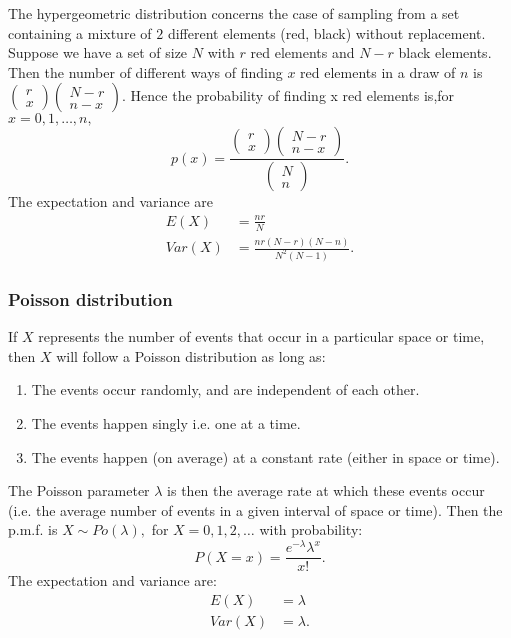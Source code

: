 \documentclass[12pt, a4paper]{article}
\theoremstyle{definition}
\theoremstyle{plain}
\begin{document}
The hypergeometric distribution concerns the case of sampling from a set containing a mixture of
$2$ different elements (red, black) without replacement. Suppose we have a set of size $N$ with $r$ red elements and $N - r$ black elements. Then the number of different ways of finding $x$ red elements in a draw of $n$ is $\begin{pmatrix} r\\x \end{pmatrix}\begin{pmatrix} N-r\\n-x \end{pmatrix}.$ Hence the probability of finding x red elements is,for $x=0, 1,\ldots, n,$ $$p(x)=\frac{\begin{pmatrix} r\\x \end{pmatrix}\begin{pmatrix} N-r\\n-x \end{pmatrix}}{\begin{pmatrix} N\\n \end{pmatrix}}.$$ The expectation and variance are $$\begin{aligned}
E(X)&=\frac{nr}{N} \\
Var(X)&=\frac{nr(N-r)(N-n)}{N^2(N-1)}.
\end{aligned}$$

\subsubsection{Poisson distribution}

If $X$ represents the number of events that occur in a particular space or time, then $X$ will follow a Poisson distribution as long as:\begin{enumerate}
	
	\item The events occur randomly, and are independent of each other.

	\item The events happen singly i.e. one at a time.

	\item The events happen (on average) at a constant rate (either in space or time).
\end{enumerate} The Poisson parameter $\lambda$ is then the average rate at which these events occur (i.e. the average number of events in a given interval of space or time). Then the p.m.f. is $X \sim Po(\lambda),$ for $X=0,1,2,\ldots$ with probability: $$P(X=x)=\frac{e^{-\lambda}\lambda^x}{x!}.$$ The expectation and variance are: $$\begin{aligned}E(X)&=\lambda \\ Var(X)&=\lambda.\end{aligned}$$
\end{document}
